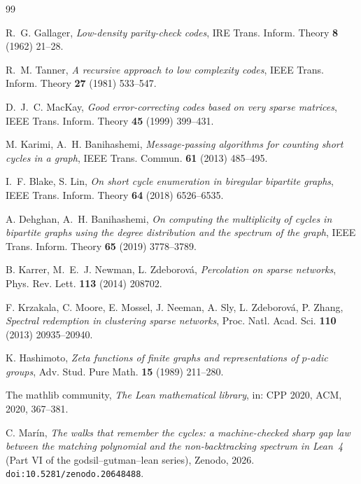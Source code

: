 \documentclass[11pt]{article}
\begin{document}
\begin{thebibliography}{99}\small

 R.~G. Gallager,
\emph{Low-density parity-check codes}, IRE Trans. Inform. Theory \textbf{8} (1962) 21--28.

 R.~M. Tanner,
\emph{A recursive approach to low complexity codes}, IEEE Trans. Inform. Theory \textbf{27}
(1981) 533--547.

 D.~J.~C. MacKay,
\emph{Good error-correcting codes based on very sparse matrices}, IEEE Trans. Inform. Theory
\textbf{45} (1999) 399--431.

 M. Karimi, A.~H. Banihashemi,
\emph{Message-passing algorithms for counting short cycles in a graph},
IEEE Trans. Commun. \textbf{61} (2013) 485--495.

 I.~F. Blake, S. Lin,
\emph{On short cycle enumeration in biregular bipartite graphs},
IEEE Trans. Inform. Theory \textbf{64} (2018) 6526--6535.

 A. Dehghan, A.~H. Banihashemi,
\emph{On computing the multiplicity of cycles in bipartite graphs using the degree
distribution and the spectrum of the graph}, IEEE Trans. Inform. Theory \textbf{65} (2019)
3778--3789.

 B. Karrer, M.~E.~J. Newman, L. Zdeborov\'a,
\emph{Percolation on sparse networks}, Phys. Rev. Lett. \textbf{113} (2014) 208702.

 F. Krzakala, C. Moore, E. Mossel, J. Neeman, A. Sly, L. Zdeborov\'a,
P. Zhang, \emph{Spectral redemption in clustering sparse networks},
Proc. Natl. Acad. Sci. \textbf{110} (2013) 20935--20940.

 K. Hashimoto,
\emph{Zeta functions of finite graphs and representations of $p$-adic groups},
Adv. Stud. Pure Math. \textbf{15} (1989) 211--280.

 The mathlib community,
\emph{The Lean mathematical library}, in: CPP 2020, ACM, 2020, 367--381.

 C. Mar\'in,
\emph{The walks that remember the cycles: a machine-checked sharp gap law between the
matching polynomial and the non-backtracking spectrum in Lean~4} (Part VI of the
godsil--gutman--lean series), Zenodo, 2026. \texttt{doi:10.5281/zenodo.20648488}.

\end{thebibliography}
\end{document}

